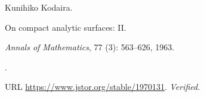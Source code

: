 Kunihiko Kodaira.

\newblock On compact analytic surfaces: {II}.

\newblock \emph{Annals of Mathematics}, 77 (3): 563--626,
  1963.

\newblock {}.

\newblock URL \url{https://www.jstor.org/stable/1970131}.
\newblock \emph{Verified}.

